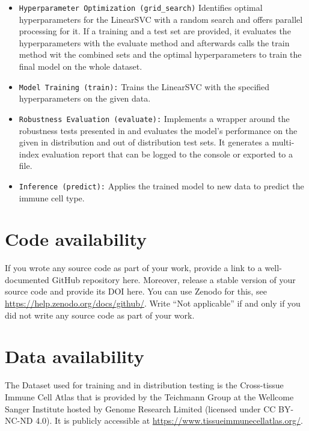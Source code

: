 \documentclass[11pt]{article}
\begin{document}
\begin{itemize}
    \item \texttt{Hyperparameter Optimization (\texttt{grid\_search})} Identifies optimal hyperparameters for the LinearSVC with a random search and offers parallel processing for it. If a training and a test set are provided, it evaluates the hyperparameters with the evaluate method and afterwards calls the train method wit the combined sets and the optimal hyperparameters to train the final model on the whole dataset.
    \item \texttt{Model Training (\texttt{train}):} Trains the LinearSVC with the specified hyperparameters on the given data.
    \item \texttt{Robustness Evaluation (\texttt{evaluate}):} Implements a wrapper around the robustness tests presented in  and evaluates the model's performance on the given in distribution and out of distribution test sets. It generates a multi-index evaluation report that can be logged to the console or exported to a file.
    \item \texttt{Inference (\texttt{predict}):} Applies the trained model to new data to predict the immune cell type.
\end{itemize}




\section{Code availability}\label{sec:code}

If you wrote any source code as part of your work, provide a link to a well-documented GitHub repository here. Moreover, release a stable version of your source code and provide its DOI here. You can use Zenodo for this, see \url{https://help.zenodo.org/docs/github/}. Write ``Not applicable'' if and only if you did not write any source code as part of your work.


\section{Data availability}\label{sec:data}

The Dataset used for training and in distribution testing is the Cross-tissue Immune Cell Atlas that is provided by the Teichmann Group at the Wellcome Sanger Institute hosted by Genome Research Limited (licensed under CC BY-NC-ND 4.0). It is publicly accessible at \url{https://www.tissueimmunecellatlas.org/}. %
\cite{dominguez_conde_cross-tissue_2022} %
\end{document}
